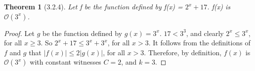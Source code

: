 \documentclass[a4paper, 12pt]{article}
\theoremstyle{plain}
\newtheorem*{theorem*}{Theorem}
\begin{document}
	
	\begin{theorem*}[3.2.4]
		Let f be the function defined by f(x) = $2^{x} + 17$. \newline f(x) is $\mathcal{O}(3^{x})$.
	\end{theorem*}
	
	\begin{proof}
		Let $g$ be the function defined by $g(x) = 3^{x}$. $17 < 3^{3}$, and clearly \newline $2^{x} \le 3^{x}$, for all $x \ge 3$. So $2^{x} + 17 \le 3^{x} + 3^{x}$, for all $x > 3$. It follows from the definitions of $f$ and $g$ that $|f(x)| \le 2|g(x)|$, for all $x > 3$. Therefore, by definition, $f(x)$ is $\mathcal{O}(3^{x})$ with constant witnesses $C = 2$, and $k = 3$.
	\end{proof}
\end{document}
